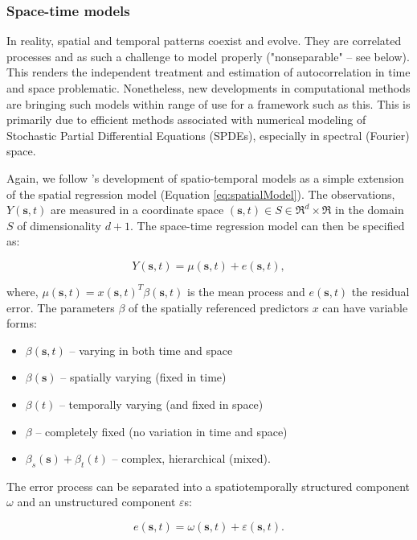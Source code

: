 \documentclass[letterpaper,portrait,11pt]{scrartcl}
\numberwithin{equation}{section}    %
\numberwithin{figure}{section}    %
\numberwithin{table}{section}       %
\begin{document}
\subsubsection{Space-time models}
\label{sec:spacetime}
In reality, spatial and temporal patterns coexist and evolve. They are correlated processes and as such a challenge to model properly ("nonseparable" -- see below). This renders the independent treatment and estimation of autocorrelation in time and space problematic. Nonetheless, new developments in computational methods are bringing such models within range of use for a framework such as this. This is primarily due to efficient methods associated with numerical modeling of Stochastic Partial Differential Equations (SPDEs), especially in spectral (Fourier) space.

Again, we follow \textcite{banerjee2014hierarchical}'s development of spatio-temporal models as a simple extension of the spatial regression model (Equation \ref{eq:spatialModel}). The observations, $Y(\bm{s},t)$ are measured in a coordinate space $(\bm{s},t) \in S \in \Re^d \times \Re $ in the domain $S$ of dimensionality $d +1$. The space-time regression model can then be specified as:

\begin{equation}
  \label{eq:spacetimeModel}
  Y(\bm{s},t) = \mu(\bm{s},t) + e(\bm{s},t) ,
\end{equation}

where, $\mu(\bm{s},t) = x(\bm{s},t)^{T} \beta(\bm{s},t)$ is the mean process and $e(\bm{s},t)$ the residual error. The parameters $\beta$ of the spatially referenced predictors $x$ can have variable forms:

\begin{itemize}
  \item $\beta(\bm{s},t)$ -- varying in both time and space
  \item $\beta(\bm{s})$ -- spatially varying (fixed in time)
  \item $\beta(t)$ -- temporally varying (and fixed in space)
  \item $\beta$ -- completely fixed (no variation in time and space)
  \item $\beta_{s}(\bm{s}) + \beta_{t}(t)$ -- complex, hierarchical (mixed).
\end{itemize}


The error process can be separated into a spatiotemporally structured component $\omega$ and an unstructured component $\varepsilon$s:

\[ e(\bm{s},t) = \omega(\bm{s},t) +  \varepsilon(\bm{s},t) .\]
\end{document}
